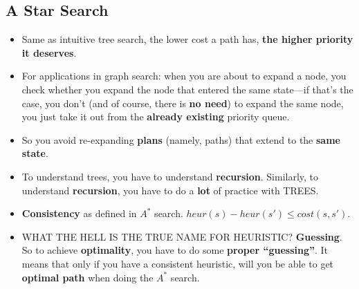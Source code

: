 \documentclass[twocolumn]{article}
\begin{document}
\subsection{A Star Search}
\label{sec:star-search}

\begin{itemize}
\item Same as intuitive tree search, the lower cost a path has,
  \textbf{the higher priority it deserves}.
\item For applications in graph search: when you are about to expand a
  node, you check whether you expand the node that entered the same
  state---if  that's the case, you don't (and of course, there is
  \textbf{no need}) to expand the same node, you just take it out from
  the \textbf{already existing} priority queue.
\item So you avoid re-expanding \textbf{plans} (namely, paths) that
  extend to the \textbf{same state}.
\item To understand trees, you have to understand
  \textbf{recursion}. Similarly, to understand \textbf{recursion}, you
  have to do a \textbf{lot} of practice with TREES\@.
\item \textbf{Consistency} as defined in $A^{*}$
  search. $heur(s)-heur(s')\leq cost(s,s')$.
\item WHAT THE HELL IS THE TRUE NAME FOR HEURISTIC\@?
  \textbf{Guessing}. So to achieve \textbf{optimality}, you have to do
  some \textbf{proper ``guessing''}. It means that only if you have a
  consistent heuristic, will you be able to get \textbf{optimal path}
  when doing the $A^{*}$ search.
\end{itemize}
\end{document}
